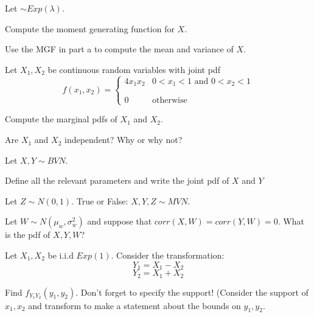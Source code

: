 \documentclass{article}
\newcommand{\pdf}[2]{\left\{\begin{matrix}
{#1} & {#2}\\\\\\0&\textrm{otherwise}
\end{matrix}\right.}
\begin{document}
\begin{problem}{20}
Let $\sim Exp(\lambda)$.
\vspace{1pc}


Compute the moment generating function for $X$.
\vspace{1pc}


Use the MGF in part a to compute the mean and variance of $X$.
\vspace{1pc}

\end{problem}
\begin{problem}{15}
Let $X_1,X_2$ be continuous random variables with joint pdf 
$$f(x_1,x_2) = \pdf{4x_1x_2}{0<x_1<1 \textrm{ and } 0<x_2<1}$$

\vspace{1pc}

Compute the marginal pdfs of $X_1$ and $X_2$.

\vspace{1pc}

Are $X_1$ and $X_2$ independent? Why or why not?

\end{problem}


\begin{problem}{25}
Let $X,Y \sim BVN$.

\vspace{1pc}

Define all the relevant parameters and write the joint pdf of $X$ and $Y$

\vspace{1pc}


Let $Z\sim N(0,1)$. True or False: $X,Y,Z \sim MVN$.

\vspace{1pc}


Let $W\sim N(\mu_w,\sigma^2_w)$ and suppose that $corr(X,W) = corr(Y,W) = 0$. What is the pdf of $X,Y,W$?
 
\end{problem}

\begin{problem}{20}
Let $X_1,X_2$ be i.i.d $Exp(1)$. Consider the transformation:
$$Y_1 = X_1 - X_2$$
$$Y_2 = X_1 + X_2$$

Find $f_{Y_1Y_2}(y_1,y_2)$. Don't forget to specify the support! (Consider the support of $x_1,x_2$ and transform to make a statement about the bounds on $y_1,y_2$. 
\end{problem}
\end{document}
